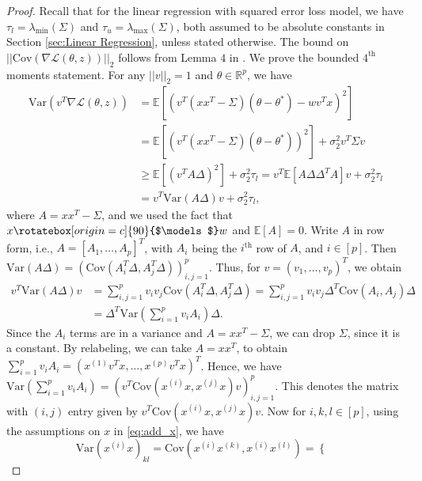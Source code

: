 \documentclass{article}
\newcommand{\indep}{\rotatebox[origin=c]{90}{$\models$}}
\begin{document}
\begin{proof}
Recall that for the linear regression with squared error loss model, we have $\tau_l = \lambda_{\min}(\Sigma)$ and $\tau_u = \lambda_{\max}(\Sigma)$, both assumed to be absolute constants in  Section \ref{sec:Linear Regression}, unless stated otherwise. The bound on $||\mathrm{\mathrm{Cov}}(\nabla \mathcal{L}(\theta, z))||_2$ follows from Lemma $4$ in \cite{RE}. We prove the bounded $4^{\text{th}}$ moments statement. For any $||v||_2 = 1$ and $\theta \in \mathbb{R}^p$, we have
\begin{align*}
\mathrm{Var}\left(v^T\nabla \mathcal{L}(\theta, z)\right) &= \mathbb{E}\left[\left(v^T(xx^T - \Sigma)(\theta - \theta^*) - wv^Tx\right)^2\right]\\
&= \mathbb{E}\left[\left(v^T(xx^T - \Sigma)(\theta - \theta^*)\right)^2\right] + \sigma_2^2v^T\Sigma v\\
&\geq \mathbb{E}\left[\left(v^TA\Delta\right)^2\right] + \sigma_2^2\tau_l = v^T\mathbb{E}[A\Delta\Delta^TA]v + \sigma_2^2\tau_l\\
&= v^T\mathrm{Var}(A\Delta)v + \sigma_2^2\tau_l,
\end{align*}
where $A = xx^T - \Sigma$, and we used the fact that $x \indep w$ and $\mathbb{E}[A] = 0$. Write $A$ in row form, i.e., $A = [A_1, \dots, A_p]^T$, with $A_i$ being the $i^{\text{th}}$ row of $A$, and $i \in [p]$. Then $\mathrm{Var}(A\Delta) = \left(\mathrm{Cov}\left(A_i^T\Delta, A_j^T\Delta\right)\right)_{i, j = 1}^p$. Thus, for $v = (v_1, \dots, v_p)^T$, we obtain
\begin{align*}
v^T\mathrm{Var}(A\Delta)v &= \sum_{i, j = 1}^pv_iv_j\mathrm{Cov}\left(A_i^T\Delta, A_j^T\Delta\right) = \sum_{i, j = 1}^p v_iv_j\Delta^T\mathrm{Cov}(A_i, A_j)\Delta\\
&= \Delta^T \mathrm{Var}\left(\sum_{i = 1}^pv_iA_i\right)\Delta.
\end{align*}
Since the $A_i$ terms are in a variance and $A = xx^T - \Sigma$, we can drop $\Sigma$, since it is a constant. By relabeling, we can take $A = xx^T$, to obtain $\sum_{i = 1}^p v_i A_i = \left(x^{(1)}v^Tx, \dots, x^{(p)}v^Tx\right)^T$. Hence, we have $\mathrm{Var}\left(\sum_{i = 1}^pv_iA_i\right) = \left(v^T\mathrm{Cov}\left(x^{(i)}x, x^{(j)}x\right)v\right)_{i, j = 1}^p$. This denotes the matrix with $(i, j)$ entry given by $v^T\mathrm{Cov}\left(x^{(i)}x, x^{(j)}x\right)v$. Now for $i, k, l \in [p]$, using the assumptions on $x$ in \eqref{eq:add_x}, we have
\[
\mathrm{Var}\left(x^{(i)}x\right)_{kl} = \mathrm{Cov}\left(x^{(i)}x^{(k)}, x^{(i)}x^{(l)}\right) = \begin{cases} 

\end{cases}\]
\end{proof}
\end{document}
